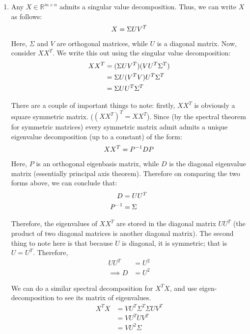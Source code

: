 \documentclass[submit]{harvardml}
\begin{document}
\begin{enumerate}[label=(\alph*)]
	\item Any $X \in \mathbb{R}^{m \times n}$ admits a singular value decomposition. Thus, we can write $X$ as follows:
		\begin{align} \centering
			X = \Sigma U V^T
		\end{align}
		Here, $\Sigma$ and $V$ are orthogonal matrices, while $U$ is a diagonal matrix. Now, consider $X X^T$. We write this out using the singular value decomposition:
	\begin{align} \centering
		X X^T &= (\Sigma U V^T) (V U^T \Sigma^T)\\
			&= \Sigma U (V^T V) U^T \Sigma^T\\
			&= \Sigma U U^T \Sigma^T 
	\end{align}				
			
			There are a couple of important things to note: firstly, $X X^T$ is obviously a square symmetric matrix. ($(XX^T)^T = XX^T$). Since (by the spectral theorem for symmetric matrices) every symmetric matrix admit admits a unique eigenvalue decomposition (up to a constant) of the form:
	\begin{align} \centering
		X X^T = P^{-1} D P
	\end{align}
Here, $P$ is an orthogonal eigenbasis matrix, while $D$ is the diagonal eigenvalue matrix (essentially principal axis theorem). Therefore on comparing the two forms above, we can conclude that:
\begin{align} \centering
	D &= U U^T \\
	P^{-1} &= \Sigma
\end{align} 

Therefore, the eigenvalues of $X X^T$ are stored in the diagonal matrix $UU^T$ (the product of two diagonal matrices is another diagonal matrix). The second thing to note here is that because $U$ is diagonal, it is symmetric; that is $U= U^T$. Therefore, 
\begin{align}
	UU^T &= U^2\\
	\implies D &= U^2
\end{align}

We can do a similar spectral decomposition for $X^T X$, and use eigen-decomposition to see its matrix of eigenvalues. 
	\begin{align}
	X^T X &= V U^T \Sigma^T \Sigma U V^T \\
		&= V U^T U V^T \\
		&= V U^2 \Sigma
	\end{align}	 


\end{enumerate}
\end{document}
